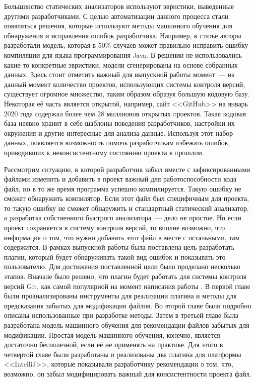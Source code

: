 Большинство статических анализаторов используют эвристики, выведенные другими разработчиками. С целью автоматизации данного процесса стали появляться решения, которые используют методы машинного обучения для обнаружения и исправления ошибок разработчика. Например, в статье \cite{static-analysis-ml} авторы разработали модель, которая в 50\% случаев может правильно исправить ошибку компиляции для языка программирования Java. В решении не использовались какие-то конкретные эвристики, модели сгенерированы на основе собранных данных. Здесь стоит отметить важный для выпускной работы момент~--- на данный момент количество проектов, использующих системы контроля версий, существует огромное множество, таким образом образуя большую кодовую базу. Некоторая её часть является открытой, например, сайт <<GitHub>> на январь 2020 года содержал более чем 28 миллионов открытых проектов. Такая кодовая база неявно хранит в себе шаблоны поведения разработчиков, настройки их окружения и другие интересные для анализа данные. Используя этот набор данных, появляется возможность помочь разработчикам избежать ошибок, приводивших к неконсистентному состоянию проекта в прошлом.

Рассмотрим ситуацию, в которой разработчик забыл вместе с зафиксированными файлами изменить и добавить в проект важный для работоспособности кода файл, но в то же время программа успешно компилируется. Такую ошибку не сможет обнаружить компилятор. Если этот файл был специфичным для проекта, то такую ошибку не сможет обнаружить и стандартный статический анализатор, а разработка собственного быстрого анализатора~--- дело не простое. Но если проект сохраняется в систему контроля версий, то вполне возможно, что информация о том, что нужно добавить этот файл в месте с остальными, там содержится. В рамках выпускной работы была поставлена цель разработать плагин, который будет обнаруживать такой вид ошибок и показывать это пользователю. Для достижения поставленной цели было проделано несколько этапов. Вначале было решено, что плагин будет работать для системы контроля версий Git, как самой популярной на момент написания работы \cite{best-vcs}. В первой главе были проанализированы инструменты для реализации плагина и методы для предсказания забытых для модификации файлов. Во второй главе были подробно описаны использованные при разработке методы. Затем в третьей главе была разработана модель машинного обучения для рекомендации файлов забытых для модификации. Простая модель машинного обучения, конечно, является достаточно бесполезной, если её не применять на практике. Для этого в четвертой главе были разработаны и реализованы два плагина для платформы <<IntelliJ>>, которые показывали разработчику рекомендации о том, что, возможно, он забыл модифицировать важный для консистентности проекта файл.